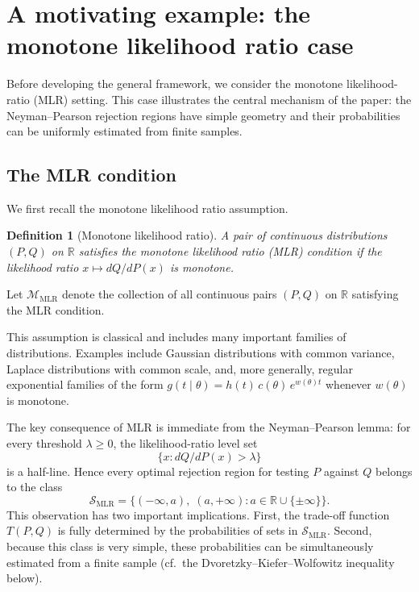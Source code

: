 \documentclass[english]{article}
\theoremstyle{plain}
\newtheorem{definition}{Definition}[section]
\theoremstyle{definition}
\newcommand{\Toff}[2]{T(#1,#2)}
\newcommand{\smlr}{\mathcal{S}_{\mathrm{MLR}}}     %
\begin{document}
\section{A motivating example: the monotone likelihood ratio case}\label{sec:mlr}
Before developing the general framework, we consider the monotone likelihood-ratio (MLR) setting. 
This case illustrates the central mechanism of the paper: the Neyman--Pearson rejection regions have simple geometry and their probabilities can be uniformly estimated from finite samples. 

\subsection{The MLR condition}

We first recall the monotone likelihood ratio assumption.

\begin{definition}[Monotone likelihood ratio]\label{def:mlr}
A pair of continuous distributions $(P,Q)$ on $\mathbb{R}$ satisfies the
\emph{monotone likelihood ratio} (MLR) condition if the likelihood ratio
$x \mapsto dQ/dP(x)$ is monotone.
\end{definition}

\noindent Let $\mathcal M_{\mathrm{MLR}}$ denote the collection of all
continuous pairs $(P,Q)$ on $\mathbb R$ satisfying the MLR condition.
\medskip

This assumption is classical and includes many important families of distributions. Examples
include Gaussian distributions with common variance, Laplace distributions with
common scale, and, more generally, regular exponential families of the form
$g(t\mid\theta) = h(t)\,c(\theta)\,e^{w(\theta)t}$ whenever $w(\theta)$ is
monotone.

The key consequence of MLR is immediate from the Neyman--Pearson lemma: for
every threshold $\lambda \geqslant 0$, the likelihood-ratio level set
\[
\{x : dQ/dP(x) > \lambda\}
\]
is a half-line. Hence every optimal rejection region for testing $P$ against
$Q$ belongs to the class
\[
\smlr = \{(-\infty, a),\; (a, +\infty) : a \in \mathbb{R} \cup \{\pm\infty\}\}.
\]
This observation has two important implications. First, the trade-off function
$\Toff{P}{Q}$ is fully determined by the probabilities of sets in
$\mathcal{S}_{\mathrm{MLR}}$. Second, because this class is very simple, these
probabilities can be simultaneously estimated from a finite sample (cf.~the
Dvoretzky--Kiefer--Wolfowitz inequality below).
\end{document}

